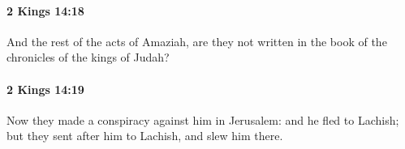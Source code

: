 		\paragraph{2 Kings 14:18} %
			\label{2KINGS-14-18}

			And the rest of the acts of Amaziah, are they not written in the book of the chronicles of the kings of Judah?


		\paragraph{2 Kings 14:19} %
			\label{2KINGS-14-19}

			Now they made a conspiracy against him in Jerusalem: and he fled to Lachish; but they sent after him to Lachish, and slew him there.


